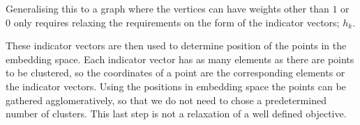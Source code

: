 Generalising this to a graph where the vertices can have weights other than \(1\) or \(0\)
only requires relaxing the requirements on the form of the indicator vectors; \(h_k\).

These indicator vectors are then used to determine position of the points in the embedding space.
Each indicator vector has as many elements as there are points to be clustered,
so the coordinates of a point are the corresponding elements or the indicator vectors.
Using the positions in embedding space the points can be gathered agglomeratively,
so that we do not need to chose a predetermined number of clusters.
This last step is not a relaxation of a well defined objective.
